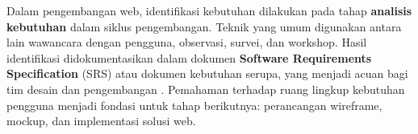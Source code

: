 Dalam pengembangan web, identifikasi kebutuhan dilakukan pada tahap \textbf{analisis kebutuhan} dalam siklus pengembangan. Teknik yang umum digunakan antara lain wawancara dengan pengguna, observasi, survei, dan workshop. Hasil identifikasi didokumentasikan dalam dokumen \textbf{Software Requirements Specification} (SRS) atau dokumen kebutuhan serupa, yang menjadi acuan bagi tim desain dan pengembangan \cite{baeldungRequirements}. Pemahaman terhadap ruang lingkup kebutuhan pengguna menjadi fondasi untuk tahap berikutnya: perancangan wireframe, mockup, dan implementasi solusi web.
